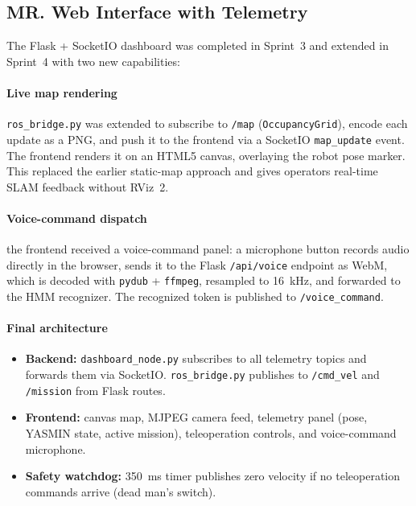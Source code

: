 \documentclass[conference]{IEEEtran}
\begin{document}
\subsection{MR. Web Interface with Telemetry }

The Flask + SocketIO dashboard was completed in Sprint~3 and extended in
Sprint~4 with two new capabilities:

\paragraph{Live map rendering} \texttt{ros\_bridge.py} was extended to subscribe to \texttt{/map} (\texttt{OccupancyGrid}), encode each
update as a PNG, and push it to the frontend via a SocketIO
\texttt{map\_update} event. The frontend renders it on an HTML5 canvas,
overlaying the robot pose marker. This replaced the earlier static-map
approach and gives operators real-time SLAM feedback without RViz~2.

\paragraph{Voice-command dispatch} the frontend received a voice-command
panel: a microphone button records audio directly in the browser, sends it
to the Flask \texttt{/api/voice} endpoint as WebM, which is decoded with
\texttt{pydub} + \texttt{ffmpeg}, resampled to 16~kHz, and forwarded to
the HMM recognizer. The recognized token is published to
\texttt{/voice\_command}.

\paragraph{Final architecture}
\begin{itemize}[noitemsep, leftmargin=*]
  \item \textbf{Backend:} \texttt{dashboard\_node.py} subscribes to all
        telemetry topics and forwards them via SocketIO.
        \texttt{ros\_bridge.py} publishes to \texttt{/cmd\_vel} and
        \texttt{/mission} from Flask routes.
  \item \textbf{Frontend:} canvas map, MJPEG camera feed, telemetry panel
        (pose, YASMIN state, active mission), teleoperation controls, and
        voice-command microphone.
  \item \textbf{Safety watchdog:} 350~ms timer publishes zero velocity if
        no teleoperation commands arrive (dead man's switch).
\end{itemize}
\end{document}
